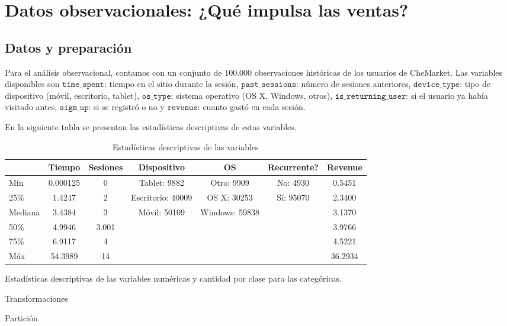 \documentclass[conference]{IEEEtran}
\begin{document}
\section{Datos observacionales: ¿Qué impulsa las ventas?}

\subsection{Datos y preparación}

Para el análisis observacional, contamos con un conjunto de $100.000$ observaciones históricas de los usuarios de CheMarket. Las variables disponibles son $\texttt{time\_spent}$: tiempo en el sitio durante la sesión, $\texttt{past\_sessions}$: número de sesiones anteriores, 
$\texttt{device\_type}$: tipo de dispositivo (móvil, escritorio, tablet), $\texttt{os\_type}$: sistema operativo (OS X, Windows, otros), $\texttt{is\_returning\_user}$: si el usuario ya había visitado antes, $\texttt{sign\_up}$: si se registró o no y $\texttt{revenue}$: cuanto gastó en cada sesión.

En la siguiente tabla se presentan las estadísticas descriptivas de estas variables.


\begin{table}[H]
\ssmall
\centering
\caption{Estadísticas descriptivas de las variables}
\begin{tabular}{|l|c|c|c|c|c|c|}
\hline
 & \textbf{Tiempo} & \textbf{Sesiones} & \textbf{Dispositivo} & \textbf{OS} & \textbf{Recurrente?} & \textbf{Revenue} \\
\hline
Mín & 0.000125 & 0 & Tablet: 9882 & Otro: 9909 & No: 4930 & 0.5451 \\
25\% & 1.4247 & 2 & Escritorio: 40009 & OS X: 30253 & Sí: 95070 & 2.3400 \\
Mediana & 3.4384 & 3 & Móvil: 50109 & Windows: 59838 & & 3.1370 \\
50\% & 4.9946 & 3.001 & & & & 3.9766 \\
75\%  & 6.9117 & 4  & & & & 4.5221 \\
Máx & 54.3989 & 14  & & & & 36.2934 \\
\hline
\end{tabular}

\hfill \break
Estadísticas descriptivas de las variables numéricas y cantidad por clase para las categóricas.

\end{table}

Transformaciones

Partición
\end{document}
